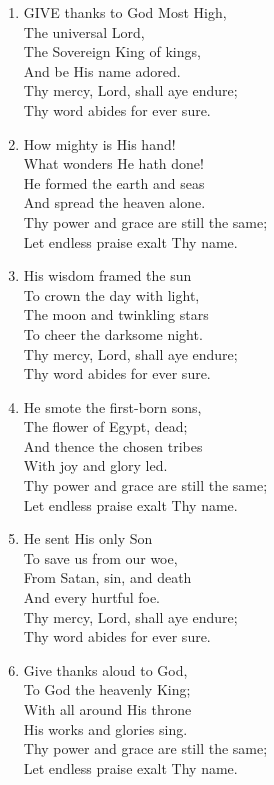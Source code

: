 \begin{enumerate}
    \item GIVE thanks to God Most High, \\
        The universal Lord, \\
        The Sovereign King of kings, \\
        And be His name adored. \\
        Thy mercy, Lord, shall aye endure; \\
        Thy word abides for ever sure.

    \item How mighty is His hand! \\
        What wonders He hath done! \\
        He formed the earth and seas \\
        And spread the heaven alone. \\
        Thy power and grace are still the same; \\
        Let endless praise exalt Thy name.

    \item His wisdom framed the sun \\
        To crown the day with light, \\
        The moon and twinkling stars \\
        To cheer the darksome night. \\
        Thy mercy, Lord, shall aye endure; \\
        Thy word abides for ever sure.

    \item He smote the first-born sons, \\
        The flower of Egypt, dead; \\
        And thence the chosen tribes \\
        With joy and glory led. \\
        Thy power and grace are still the same; \\
        Let endless praise exalt Thy name.

    \item He sent His only Son \\
        To save us from our woe, \\
        From Satan, sin, and death \\
        And every hurtful foe. \\
        Thy mercy, Lord, shall aye endure; \\
        Thy word abides for ever sure.

    \item Give thanks aloud to God, \\
        To God the heavenly King; \\
        With all around His throne \\
        His works and glories sing. \\
        Thy power and grace are still the same; \\
        Let endless praise exalt Thy name.

\end{enumerate}

